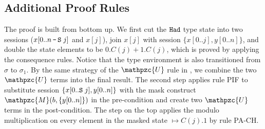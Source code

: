 \subsection{Additional Proof Rules}\label{appx:proof-rules}

The proof is built from bottom up. We first cut the $\texttt{Had}$ type state into two sessions ($x[0..n\,\texttt{-}\,\texttt{S}\;j]$ and $x[j]$), join $x[j]$ with session $\{x[0..j],y[0..n]\}$, and double the state elements to be $0.C(j)+1.C(j)$, which is proved by applying the consequence rules. Notice that the type environment is also transitioned from $\sigma$ to $\sigma_1$.
By the same strategy of the $\mathpzc{U}$ rule in , we combine the two $\mathpzc{U}$ terms into the final result. 
The second step applies rule \textsc{PIF} to substitute session $\{x[0..\texttt{S}\;j],y[0..n]\}$ with the mask construct $\mathpzc{M}(b,\{y[0..n]\})$ in the pre-condition and create two $\mathpzc{U}$ terms in the post-condition. The step on the top applies the modulo multiplication on every element in the masked state $\mapsto C(j).1$ by rule \textsc{PA-CH}.

